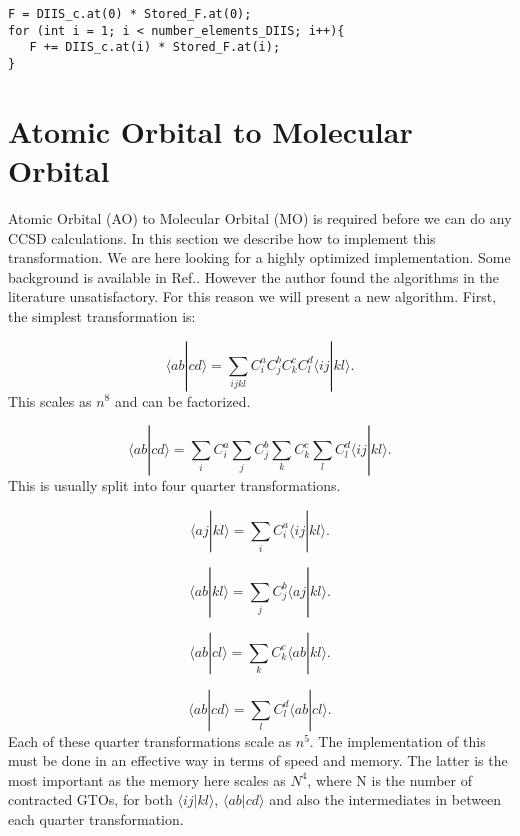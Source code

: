 \begin{lstlisting}
F = DIIS_c.at(0) * Stored_F.at(0);
for (int i = 1; i < number_elements_DIIS; i++){
   F += DIIS_c.at(i) * Stored_F.at(i);
}
\end{lstlisting}

\newpage

\section{Atomic Orbital to Molecular Orbital}
Atomic Orbital (AO) to Molecular Orbital (MO) is required before we can do any CCSD calculations. In this section we describe how to implement this transformation. We are here looking for a highly optimized implementation. Some background is available in Ref.\cite{aotomo_1_cite}. However the author found the algorithms in the literature unsatisfactory. For this reason we will present a new algorithm. First, the simplest transformation is:

\begin{equation}
\langle ab | cd \rangle = \sum_{ijkl} C_i^a C_j^b C_k^c C_l^d \langle ij|kl \rangle .
\end{equation}
This scales as $n^8$ and can be factorized. 

\begin{equation}
\langle ab | cd \rangle = \sum_i C_i^a \sum_j C_j^b \sum_k C_k^c \sum_l C_l^d  \langle ij|kl \rangle .
\end{equation}
This is usually split into four quarter transformations. 

\begin{equation}
\langle aj|kl \rangle = \sum_{i} C_i^a \langle ij|kl \rangle .
\end{equation}

\begin{equation}
\langle ab|kl \rangle = \sum_{j} C_j^b \langle aj|kl \rangle .
\end{equation}

\begin{equation}
\langle ab|cl \rangle = \sum_{k} C_k^c \langle ab|kl \rangle .
\end{equation}

\begin{equation}
\langle ab|cd \rangle = \sum_{l} C_l^d \langle ab|cl \rangle .
\end{equation}
Each of these quarter transformations scale as $n^5$. The implementation of this must be done in an effective way in terms of speed and memory. The latter is the most important as the memory here scales as $N^4$, where N is the number of contracted GTOs, for both $\langle ij | kl\rangle$, $\langle ab | cd \rangle$ and also the intermediates in between each quarter transformation. \\

